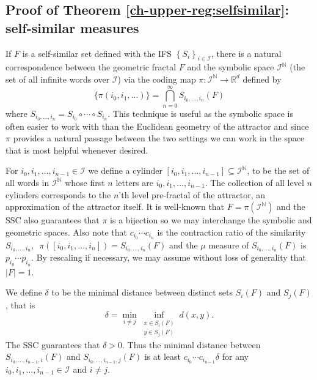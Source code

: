 \subsection{Proof of Theorem \ref{ch-upper-reg:selfsimilar}: self-similar measures} \label{ch-upper-reg:self-similar}


If $F$ is a self-similar set defined with the IFS $\left\{S_i \right\}_{i\in \mathcal{I}}$, there is a natural correspondence between the geometric fractal $F$ and the symbolic space $\mathcal{I}^{\mathbb{N}}$ (the set of all infinite words over $\mathcal{I}$) via the coding map $\pi \colon \mathcal{I}^{\mathbb{N}} \rightarrow \mathbb{R}^d$ defined by 
\[
\{\pi(i_0,i_1,\ldots) \} =  \bigcap_{n=0}^\infty S_{i_0,\ldots, i_n}(F)
\]
where $S_{i_0,\ldots, i_n} = S_{i_0} \circ \cdots \circ S_{ i_n}$. This technique is useful as the symbolic space is often easier to work with than the Euclidean geometry of the attractor and since $\pi$ provides a natural passage between the two settings we can work in the space that is most helpful whenever desired. 

For $ i_0,i_1,\ldots, i_{n-1} \in \mathcal{I}$ we define a cylinder $[i_0,i_1,\ldots, i_{n-1}] \subseteq \mathcal{I}^\mathbb{N}$, to be the set of all words in $\mathcal{I}^{\mathbb{N}}$ whose first $n$ letters are $i_0,i_1,\ldots, i_{n-1}$. The collection of all level $n$ cylinders corresponds to the  $n$'th level  pre-fractal of the attractor, an approximation of the attractor itself.  It is well-known that $F= \pi(\mathcal{I}^\mathbb{N})$ and the SSC also guarantees that $\pi$ is a bijection so we may interchange the symbolic and geometric spaces.  Also note that  $c_{i_0}\cdots c_{i_{n}}$ is the contraction ratio of the similarity $S_{i_0,\ldots, i_n} $,   $\,\,\pi([i_0,i_1,\ldots, i_{n}] ) = S_{i_0,\ldots, i_n} (F)$ and the $\mu$ measure of $S_{i_0,\ldots, i_n} (F)$  is $p_{i_0}\cdots p_{i_{n}}$.  By rescaling if necessary, we may assume without loss of generality that $\lvert F \rvert=1$. 


We define $\delta$ to be the minimal distance between distinct  sets $S_i(F)$ and $S_j(F)$, that is 
\[
\delta= \min_{i\neq j} \inf_{\substack{x \in S_i(F) \\ y \in S_j(F)}} d(x,y).
\]
The SSC guarantees that $\delta > 0$. Thus the minimal distance between $S_{i_0,\ldots,i_{n-1},i}(F)$ and $S_{i_0,\ldots,i_{n-1},j}(F)$ is at least $c_{i_0}\cdots c_{i_{n-1}} \delta$ for any   $ i_0,i_1,\ldots, i_{n-1} \in \mathcal{I}$ and $i\neq j$.


